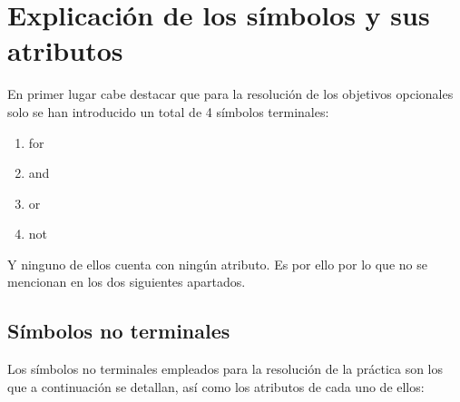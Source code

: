 \documentclass[12pt,a4paper, landscape]{article}
\theoremstyle{mytheor}
\begin{document}
\section{Explicación de los símbolos y sus atributos}
En primer lugar cabe destacar que para la resolución de los objetivos opcionales solo se han introducido un total de 4 símbolos terminales:
\begin{enumerate}
\item for
\item and
\item or
\item not
\end{enumerate}
Y ninguno de ellos cuenta con ningún atributo. Es por ello por lo que no se mencionan en los dos siguientes apartados.
\subsection{Símbolos no terminales}
Los símbolos no terminales empleados para la resolución de la práctica son los que a continuación se detallan, así como los atributos de cada uno de ellos:
\end{document}
